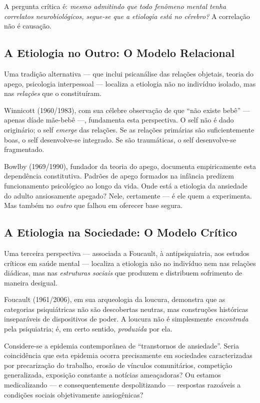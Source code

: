 A pergunta crítica é: \textit{mesmo admitindo que todo fenômeno mental tenha correlatos neurobiológicos, segue-se que a etiologia está no cérebro?} A correlação não é causação.

\subsection{A Etiologia no Outro: O Modelo Relacional}

Uma tradição alternativa --- que inclui psicanálise das relações objetais, teoria do apego, psicologia interpessoal --- localiza a etiologia não no indivíduo isolado, mas nas \textit{relações} que o constituíram.

Winnicott (1960/1983), com sua célebre observação de que \enquote{não existe bebê} --- apenas díade mãe-bebê ---, fundamenta esta perspectiva. O self não é dado originário; o self \textit{emerge} das relações. Se as relações primárias são suficientemente boas, o self desenvolve-se integrado. Se são traumáticas, o self desenvolve-se fragmentado.

Bowlby (1969/1990), fundador da teoria do apego, documenta empiricamente esta dependência constitutiva. Padrões de apego formados na infância predizem funcionamento psicológico ao longo da vida. Onde está a etiologia da ansiedade do adulto ansiosamente apegado? Nele, certamente --- é ele quem a experimenta. Mas também no \textit{outro} que falhou em oferecer base segura.

\subsection{A Etiologia na Sociedade: O Modelo Crítico}

Uma terceira perspectiva --- associada a Foucault, à antipsiquiatria, aos estudos críticos em saúde mental --- localiza a etiologia não no indivíduo nem nas relações diádicas, mas nas \textit{estruturas sociais} que produzem e distribuem sofrimento de maneira desigual.

Foucault (1961/2006), em sua arqueologia da loucura, demonstra que as categorias psiquiátricas não são descobertas neutras, mas construções históricas inseparáveis de dispositivos de poder. A loucura não é simplesmente \textit{encontrada} pela psiquiatria; é, em certo sentido, \textit{produzida} por ela.

Considere-se a epidemia contemporânea de \enquote{transtornos de ansiedade}. Seria coincidência que esta epidemia ocorra precisamente em sociedades caracterizadas por precarização do trabalho, erosão de vínculos comunitários, competição generalizada, exposição constante a notícias ameaçadoras? Ou estamos medicalizando --- e consequentemente despolitizando --- respostas razoáveis a condições sociais objetivamente ansiogênicas?

